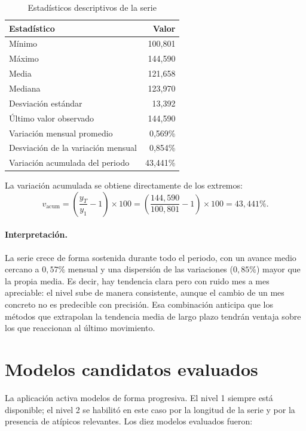 \documentclass[11pt,letterpaper]{article}
\begin{document}
\begin{table}[H]
\centering
\caption{Estadísticos descriptivos de la serie}
\begin{tabular}{@{}lr@{}}
\toprule
\textbf{Estadístico} & \textbf{Valor} \\
\midrule
Mínimo & 100{,}801 \\
Máximo & 144{,}590 \\
Media & 121{,}658 \\
Mediana & 123{,}970 \\
Desviación estándar & 13{,}392 \\
Último valor observado & 144{,}590 \\
Variación mensual promedio & 0{,}569\% \\
Desviación de la variación mensual & 0{,}854\% \\
Variación acumulada del periodo & 43{,}441\% \\
\bottomrule
\end{tabular}
\end{table}

La variación acumulada se obtiene directamente de los extremos:
\begin{equation}
v_{\text{acum}}=\left(\frac{y_T}{y_1}-1\right)\times 100
=\left(\frac{144{,}590}{100{,}801}-1\right)\times 100 = 43{,}441\%.
\end{equation}

\paragraph{Interpretación.} La serie crece de forma sostenida durante todo el
periodo, con un avance medio cercano a \(0{,}57\%\) mensual y una dispersión
de las variaciones (\(0{,}85\%\)) mayor que la propia media. Es decir, hay
tendencia clara pero con ruido mes a mes apreciable: el nivel sube de manera
consistente, aunque el cambio de un mes concreto no es predecible con
precisión. Esa combinación anticipa que los métodos que extrapolan la tendencia
media de largo plazo tendrán ventaja sobre los que reaccionan al último
movimiento.

\section{Modelos candidatos evaluados}
\label{sec:modelos}

La aplicación activa modelos de forma progresiva. El nivel 1 siempre está
disponible; el nivel 2 se habilitó en este caso por la longitud de la serie y
por la presencia de atípicos relevantes. Los diez modelos evaluados fueron:
\end{document}
